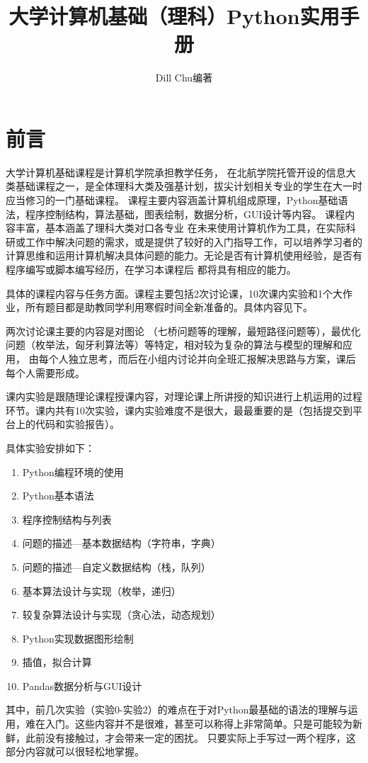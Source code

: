 \documentclass[UTF8,a5paper,10pt]{ctexbook}
\title{大学计算机基础（理科）Python实用手册}
\author{Dill Chu编著}
\begin{document}
\section*{前言}
\setcounter{page}{1}

大学计算机基础课程是计算机学院承担教学任务，
在北航学院托管开设的信息大类基础课程之一，是全体理科大类及强基计划，拔尖计划相关专业的学生在大一时应当修习的一门基础课程。
课程主要内容涵盖{计算机组成原理}，{Python基础语法}，{程序控制结构}，{算法基础}，{图表绘制}，{数据分析}，{GUI设计}等内容。
课程内容丰富，基本涵盖了理科大类对口各专业
在未来使用计算机作为工具，在实际科研或工作中解决问题的需求，或是提供了较好的入门指导工作，可以培养学习者的计算思维和运用计算机解决具体问题的能力。无论是否有计算机使用经验，是否有程序编写或脚本编写经历，在学习本课程后
都将具有相应的能力。

具体的课程内容与任务方面。课程主要包括2次讨论课，10次课内实验和1个大作业，所有题目都是助教同学利用寒假时间全新准备的。具体内容见下。

两次讨论课主要的内容是对图论
（七桥问题等的理解，最短路径问题等），最优化问题（枚举法，匈牙利算法等）等特定，相对较为复杂的算法与模型的理解和应用，
由每个人独立思考，而后在小组内讨论并向全班汇报解决思路与方案，课后每个人需要形成。

课内实验是跟随理论课程授课内容，对理论课上所讲授的知识进行上机运用的过程环节。课内共有10次实验，课内实验难度不是很大，最最重要的是（包括提交到平台上的代码和实验报告）。

具体实验安排如下：
\begin{enumerate}[itemsep=2pt,topsep=0pt,parsep=0pt,start=0]
    \setlength{\itemsep}{-0.1cm}
    \item Python编程环境的使用
    \item Python基本语法
    \item 程序控制结构与列表
    \item 问题的描述—基本数据结构（字符串，字典）
    \item 问题的描述—自定义数据结构（栈，队列）
    \item 基本算法设计与实现（枚举，递归）
    \item 较复杂算法设计与实现（贪心法，动态规划）
    \item Python实现数据图形绘制
    \item 插值，拟合计算
    \item Pandas数据分析与GUI设计
\end{enumerate}
其中，前几次实验（实验0-实验2）的难点在于对Python最基础的语法的理解与运用，难在入门。这些内容并不是很难，甚至可以称得上非常简单。只是可能较为新鲜，此前没有接触过，才会带来一定的困扰。
只要实际上手写过一两个程序，这部分内容就可以很轻松地掌握。
\end{document}
